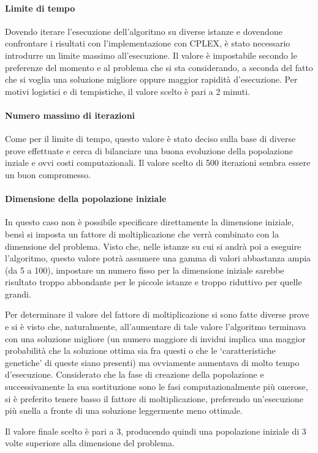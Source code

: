 \paragraph{Limite di tempo}
Dovendo iterare l'esecuzione dell'algoritmo su diverse istanze e dovendone confrontare i risultati
con l'implementazione con CPLEX, è stato necessario introdurre un limite massimo all'esecuzione.
Il valore è impostabile secondo le preferenze del momento e al problema che si sta considerando,
a seconda del fatto che si voglia una soluzione migliore oppure maggior rapidità d'esecuzione.
Per motivi logistici e di tempistiche, il valore scelto è pari a 2 minuti.
%
\paragraph{Numero massimo di iterazioni}
Come per il limite di tempo, questo valore è stato deciso sulla base di diverse prove effettuate
e cerca di bilanciare una buona evoluzione della popolazione inziale e ovvi costi computazionali.
Il valore scelto di 500 iterazioni sembra essere un buon compromesso.
%
\paragraph{Dimensione della popolazione iniziale}
In questo caso non è possibile specificare direttamente la dimensione iniziale, bensì si imposta
un fattore di moltiplicazione che verrà combinato con la dimensione del problema.
Visto che, nelle istanze su cui si andrà poi a eseguire l'algoritmo, questo valore
potrà assumere una gamma di valori abbastanza ampia (da 5 a 100), impostare un numero fisso
per la dimensione iniziale sarebbe risultato troppo abbondante per le piccole istanze
e troppo riduttivo per quelle grandi.

Per determinare il valore del fattore di moltiplicazione si sono fatte diverse prove e si è visto
che, naturalmente, all'aumentare di tale valore l'algoritmo terminava con una soluzione migliore
(un numero maggiore di invidui implica una maggior probabilità che la soluzione ottima sia fra questi
o che le `caratteristiche genetiche' di queste siano presenti) ma ovviamente aumentava di molto tempo d'esecuzione.
Considerato che la fase di creazione della popolazione e successivamente la sua sostituzione sono le fasi
computazionalmente più onerose, si è preferito tenere basso il fattore di moltiplicazione, preferendo
un'esecuzione più snella a fronte di una soluzione leggermente meno ottimale.

Il valore finale scelto è pari a 3, producendo quindi una popolazione iniziale di 3 volte superiore
alla dimensione del problema.
%
